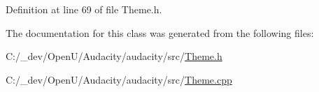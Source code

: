 Definition at line 69 of file Theme.\+h.



The documentation for this class was generated from the following files\+:\begin{DoxyCompactItemize}
\item 
C\+:/\+\_\+dev/\+Open\+U/\+Audacity/audacity/src/\hyperlink{_theme_8h}{Theme.\+h}\item 
C\+:/\+\_\+dev/\+Open\+U/\+Audacity/audacity/src/\hyperlink{_theme_8cpp}{Theme.\+cpp}\end{DoxyCompactItemize}
